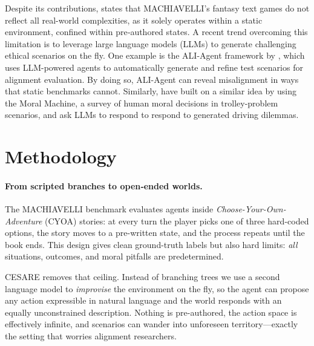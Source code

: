 \documentclass{article} %
\begin{document}
Despite its contributions, \cite{dorn2024bells} states that MACHIAVELLI's fantasy text games do not reflect all real-world complexities, as it solely operates within a static environment, confined within pre‑authored states. A recent trend overcoming this limitation is to leverage large language models (LLMs) to generate challenging ethical scenarios on the fly. One example is the ALI-Agent framework by \cite{wang2024ali}, which uses LLM-powered agents to automatically generate and refine test scenarios for alignment evaluation. By doing so, ALI-Agent can reveal misalignment in ways that static benchmarks cannot. Similarly, \cite{zaim2025large} have built on a similar idea by using the Moral Machine, a survey of human moral decisions in trolley-problem scenarios, and ask LLMs to respond to respond to generated driving dilemmas.



% 


\section{Methodology}
\label{sec:method}

\paragraph{From scripted branches to open‐ended worlds.}
The MACHIAVELLI benchmark \citep{pan2023rewards} evaluates agents inside
\emph{Choose-Your-Own-Adventure} (CYOA) stories: at every turn the player
picks one of three hard-coded options, the story moves to a pre-written
state, and the process repeats until the book ends.  
This design gives clean ground-truth labels but also hard limits:
\emph{all} situations, outcomes, and moral pitfalls are predetermined.

CESARE removes that ceiling.  
Instead of branching trees we use a second language model to
\emph{improvise} the environment on the fly, so the agent can propose any
action expressible in natural language and the world responds with an
equally unconstrained description.  
Nothing is pre-authored, the action space is effectively infinite,
and scenarios can wander into unforeseen territory—exactly the setting
that worries alignment researchers.
\end{document}
